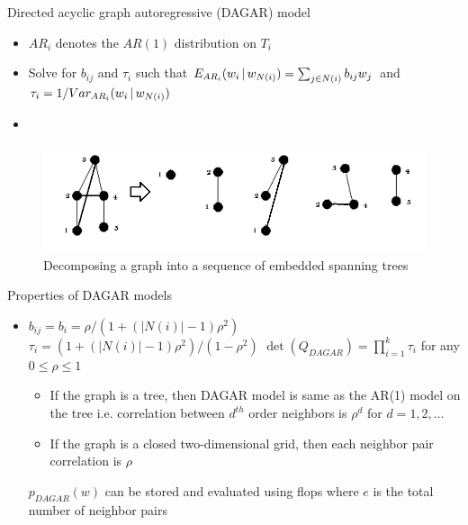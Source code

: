 \begin{frame}{Directed acyclic graph autoregressive (DAGAR) model}
	\begin{itemize}
		\vskip -10mm\item $AR_i$ denotes the $AR(1)$ distribution on $T_i$
		\item Solve for $b_{ij}$ and $\tau_i$ such that $E_{AR_i} (w_i \,|\, w_{N(i)}) = \sum_{j \in N(i)} b_{ij} w_j $ and $\tau_i = 1/Var_{AR_i}(w_i \,|\, w_{N(i)})$
		\item {}
	\end{itemize}
\vskip -8mm		\begin{figure}
			\centering
			\includegraphics[scale=0.5]{../figures/dagar.png}
			\caption{Decomposing a graph into a sequence of embedded spanning trees}
		\end{figure}
\end{frame}

\begin{frame}{Properties of DAGAR models}
	\begin{itemize}
		\item  $b_{ij} = b_i = \rho/(1+(|N(i)|-1)\rho^2)$
		\myitem $\tau_i = (1+(|N(i)|-1)\rho^2)/(1-\rho^2)$
		\myitem $\det(Q_{DAGAR}) = \prod_{i=1}^k \tau_i$
		\myitem {} for any $0 \leq \rho \leq 1$
		\myitem {} 
		\begin{itemize}
		\item If the graph is a tree, then \alert{DAGAR} model is same as the AR(1) model on the tree i.e. correlation between $d^{th}$ order neighbors is $\rho^d$ for $d=1,2,\ldots$
		\item If the graph is a closed two-dimensional grid, then each neighbor pair correlation is $\rho$
		\end{itemize}
		\myitem $p_{DAGAR}(w)$ can be stored and evaluated using  flops where $e$ is the total number of neighbor pairs
	\end{itemize}
\end{frame}


